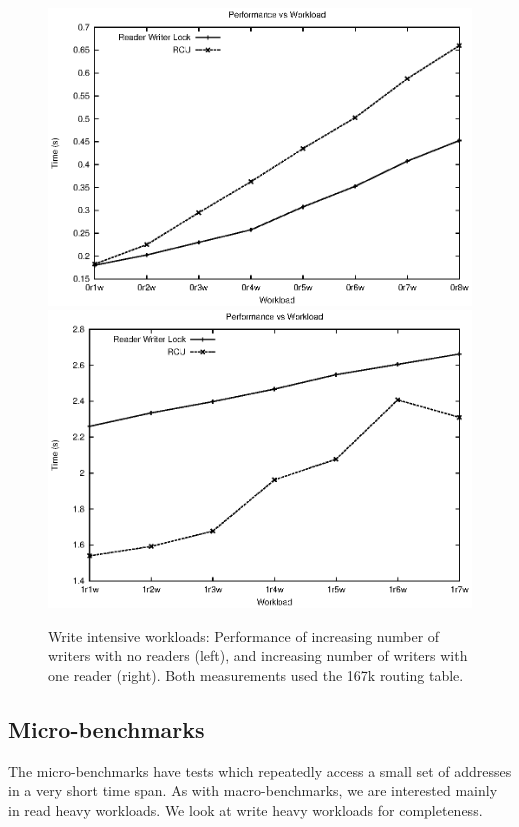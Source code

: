 \documentclass[a4paper]{article}
\begin{document}
\begin{figure}[tph]
\centering
\includegraphics[scale = 0.45]{../images/graphs/macro_0r_vw}
\includegraphics[scale = 0.45]{../images/graphs/macro_1r_vw}
\caption{Write intensive workloads: Performance of increasing number of writers with no readers (left), and increasing number of writers with one reader (right). Both measurements used the 167k routing table.}
\label{img:macro_01r_vw}
\end{figure}

\pagebreak

\subsection{Micro-benchmarks}
\label{sec:microbenchmarks}
The micro-benchmarks have tests which repeatedly access a small set of addresses in a very short time span.
As with macro-benchmarks, we are interested mainly in read heavy workloads. We look at write heavy workloads for completeness.
\end{document}
